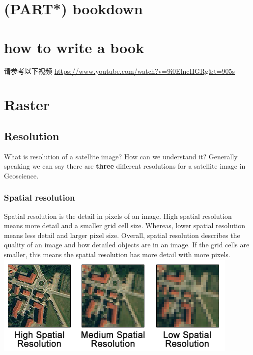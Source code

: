 \documentclass[
]{book}
\begin{document}
\hypertarget{part-bookdown}{%
\chapter{(PART*) bookdown}\label{part-bookdown}}

\hypertarget{how-to-write-a-book}{%
\chapter*{how to write a book}\label{how-to-write-a-book}}

请参考以下视频
\url{https://www.youtube.com/watch?v=9i0ElncHGRg\&t=905s}

\hypertarget{raster}{%
\chapter{Raster}\label{raster}}

\hypertarget{resolution}{%
\section{Resolution}\label{resolution}}

What is resolution of a satellite image? How can we understand it? Generally speaking we can say there are \textbf{three} different resolutions for a satellite image in Geoscience.\\

\hypertarget{spatial-resolution}{%
\subsection{\texorpdfstring{\textbf{Spatial resolution}\\
}{Spatial resolution }}\label{spatial-resolution}}

Spatial resolution is the detail in pixels of an image. High spatial resolution means more detail and a smaller grid cell size. Whereas, lower spatial resolution means less detail and larger pixel size. Overall, spatial resolution describes the quality of an image and how detailed objects are in an image. If the grid cells are smaller, this means the spatial resolution has more detail with more pixels.
\includegraphics{images/Spatial-Resolution-Comparison.png}
\end{document}
